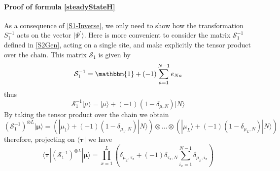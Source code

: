 \documentclass[10pt]{article}
\numberwithin{equation}{section}
\numberwithin{equation}{subsection}
\begin{document}
	\paragraph{Proof of formula \eqref{steadyStateH}} As a consequence of \eqref{S1-Inverse}, we only need to show how the transformation $S_{1}^{-1}$ acts on the vector $|\Psi^{'}\rangle$. Here is more convenient to consider the matrix $\mathcal{S}_{1}^{-1}$ defined in \eqref{S2Gen}, acting on a single site, and make explicitly the tensor product over the chain. This matrix $\mathcal{S}_{1}$ is given by
	\begin{equation}\label{S1-L1}
		\mathcal{S}_{1}^{-1}=\mathbbm{1}+(-1)\sum_{a=1}^{N-1}e_{Na}
	\end{equation}
thus
\begin{equation}
\mathcal{S}_{1}^{-1}|\mu\rangle=|\mu\rangle+(-1)(1-\delta_{\mu,N})|N\rangle
\end{equation}
By taking the tensor product over the chain we obtain 
\begin{equation}
	\left(\mathcal{S}_{1}^{-1}\right)^{\otimes L}|\bm{\mu}\rangle=\left(|\mu_{1}\rangle+(-1)(1-\delta_{\mu_{1},N})|N\rangle\right)\otimes \ldots \otimes \left(|\mu_{L}\rangle+(-1)(1-\delta_{\mu_{L},N})|N\rangle\right)
\end{equation}
therefore, projecting on $\langle \bm{\tau}|$ we have
\begin{equation}\label{Tensor-S1}
	\langle \bm{\tau}|	\left(\mathcal{S}_{1}^{-1}\right)^{\otimes L}|\bm{\mu}\rangle=\prod_{x=1}^{L}\left(\delta_{\mu_{x},\tau_{x}}+(-1)\delta_{\tau_{x},N}\sum_{i_{x}=1}^{N-1}\delta_{\mu_{x},i_{x}}\right)
\end{equation}
\end{document}
